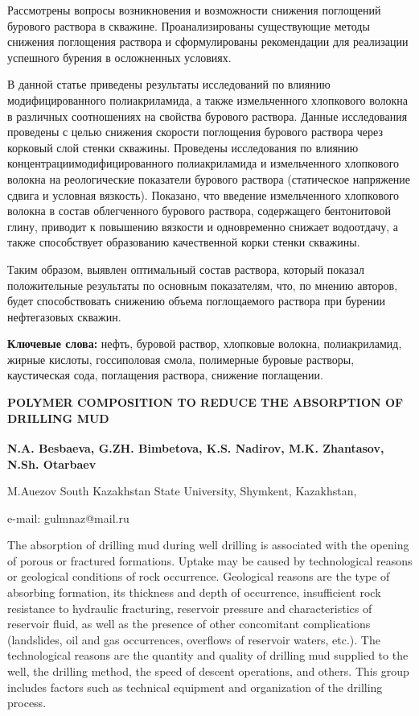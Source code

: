Рассмотрены вопросы возникновения и возможности снижения поглощений
бурового раствора в скважине. Проанализированы существующие методы
снижения поглощения раствора и сформулированы рекомендации для
реализации успешного бурения в осложненных условиях.

В данной статье приведены результаты исследований по влиянию
модифицированного полиакриламида, а также измельченного хлопкового
волокна в различных соотношениях на свойства бурового раствора. Данные
исследования проведены с целью снижения скорости поглощения бурового
раствора через корковый слой стенки скважины. Проведены исследования по
влиянию концентрациимодифицированного полиакриламида и измельченного
хлопкового волокна на реологические показатели бурового раствора
(статическое напряжение сдвига и условная вязкость). Показано, что
введение измельченного хлопкового волокна в состав облегченного бурового
раствора, содержащего бентонитовой глину, приводит к повышению вязкости
и одновременно снижает водоотдачу, а также способствует образованию
качественной корки стенки скважины.

Таким образом, выявлен оптимальный состав раствора, который показал
положительные результаты по основным показателям, что, по мнению
авторов, будет способствовать снижению объема поглощаемого раствора при
бурении нефтегазовых скважин.

{\bfseries Ключевые слова:} нефть, буровой раствор, хлопковые волокна,
полиакриламид, жирные кислоты, госсиполовая смола, полимерные буровые
растворы, каустическая сода, поглащения раствора, снижение поглащении.

\begin{articleheader}
{\bfseries POLYMER COMPOSITION TO REDUCE THE ABSORPTION OF DRILLING MUD}

{\bfseries
N.A. Besbaeva,
G.ZH. Bimbetova\textsuperscript{\envelope },
K.S. Nadirov,
M.K. Zhantasov,
N.Sh. Otarbaev
}
\end{articleheader}

\begin{affiliation}
M.Auezov South Kazakhstan State University, Shymkent, Kazakhstan,

e-mail: gulmnaz@mail.ru
\end{affiliation}

The absorption of drilling mud during well drilling is associated with
the opening of porous or fractured formations. Uptake may be caused by
technological reasons or geological conditions of rock occurrence.
Geological reasons are the type of absorbing formation, its thickness
and depth of occurrence, insufficient rock resistance to hydraulic
fracturing, reservoir pressure and characteristics of reservoir fluid,
as well as the presence of other concomitant complications (landslides,
oil and gas occurrences, overflows of reservoir waters, etc.). The
technological reasons are the quantity and quality of drilling mud
supplied to the well, the drilling method, the speed of descent
operations, and others. This group includes factors such as technical
equipment and organization of the drilling process.

